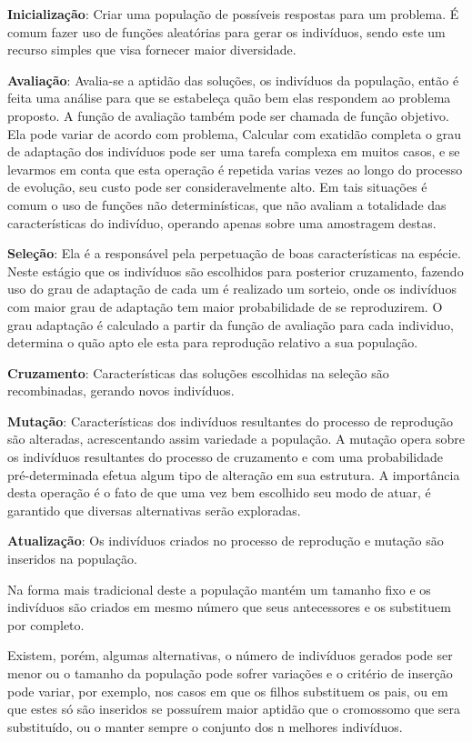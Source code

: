 \textbf{Inicialização}: Criar uma população de possíveis respostas para um problema. 
É comum fazer uso de funções aleatórias para gerar os indivíduos, sendo este um recurso simples que visa fornecer maior diversidade.

\textbf{Avaliação}: Avalia-se a aptidão das soluções, os indivíduos da população, então é feita uma análise para que se estabeleça quão bem elas respondem ao problema proposto.
A função de avaliação também pode ser chamada de função objetivo. Ela pode variar de acordo com problema,  
Calcular com exatidão completa o grau de adaptação dos indivíduos pode ser uma tarefa complexa em muitos casos, e se levarmos em conta que esta operação é repetida varias vezes ao longo do processo de evolução, seu custo pode ser consideravelmente alto. Em tais situações é comum o uso de funções não determinísticas, que não avaliam a totalidade das características do indivíduo, operando apenas sobre uma amostragem destas.

\textbf{Seleção}: Ela é a responsável pela perpetuação de boas características na espécie. 
Neste estágio que os indivíduos são escolhidos para posterior cruzamento, fazendo uso do grau de adaptação de cada um é realizado um sorteio, onde os indivíduos com maior grau de adaptação tem maior probabilidade de se reproduzirem.
O grau adaptação é calculado a partir da função de avaliação para cada individuo, determina o quão apto ele esta para reprodução relativo a sua população. 

\textbf{Cruzamento}: Características das soluções escolhidas na seleção são recombinadas, gerando novos indivíduos.

\textbf{Mutação}: Características dos indivíduos resultantes do processo de reprodução são alteradas, acrescentando assim variedade a população.
A mutação opera sobre os indivíduos resultantes do processo de cruzamento e com uma probabilidade pré-determinada efetua algum tipo de alteração em sua  estrutura. A importância desta operação é o fato de que uma vez bem escolhido seu modo de atuar, é garantido que diversas alternativas serão exploradas.
 
\textbf{Atualização}: Os indivíduos criados no processo de reprodução e mutação são inseridos na população.

Na forma mais tradicional deste a população mantém um tamanho fixo e os indivíduos são criados em mesmo número que seus antecessores e os substituem por completo. 

Existem, porém, algumas alternativas, o número de indivíduos gerados pode ser menor ou o tamanho da população pode sofrer variações e o critério de inserção pode variar, por exemplo, nos casos em que os filhos substituem os pais, ou em que estes só são inseridos se possuírem maior aptidão que o cromossomo que sera substituído, ou o manter sempre o conjunto dos n melhores indivíduos. 

